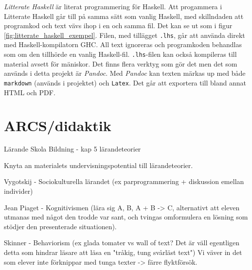 \begin{draft}
\textit{Litterate Haskell} är literat programmering för Haskell.\cite{litterate_haskell}
Att progammera i Litterate Haskell går till på samma sätt som vanlig Haskell,
med skillndaden att programkod och text vävs ihop i en och samma fil. Det kan
se ut som i figur \ref{fig:litterate_haskell_exempel}. Filen, med tillägget
\texttt{.lhs}, går att använda direkt med Haskell-kompilatorn GHC. All text
ignoreras och programkoden behandlas som om den tillhörde en vanlig
Haskell-fil. \texttt{.lhs}-filen kan också kompileras till material avsett för
mäniskor. Det finns flera verktyg som gör det men det som används i detta
projekt är \textit{Pandoc}\cite{pandoc}. Med \textit{Pandoc} kan texten märkas
up med både \texttt{markdown} (används i projektet) och \texttt{Latex}. Det går
att exportera till bland annat HTML och PDF.  \end{draft}
\section{ARCS/didaktik}
\label{sec:arcs}

\begin{binge}

Lärande Skola Bildning - kap 5 lärandeteorier

Knyta an materialets undervisningspotential till lärandeteorier.

Vygotskij - Sociokulturella lärandet (ex parprogrammering + diskussion emellan individer)

Jean Piaget - Kognitivismen (lära sig A, B, A + B -> C, alternativt att eleven utmanas med något den trodde var sant, och tvingas omformulera en lösning som stödjer den presenterade situationen).

Skinner - Behaviorism (ex glada tomater vs wall of text? Det är väll egentligen detta som hindrar läsare att läsa en "tråkig, tung svårläst text")
Vi väver in det som elever inte förknippar med tunga texter -> färre flyktförsök.

\iffalse
Skulle vilja hitta stöd för:
Bara något som olika bakgrunder skulle kunna ge en inbillning av miljöombyte, vilket minskar den monotona dimensionen, och i sig förhindrar hjärnans anti-"get-stuck-on-a-thought-and-die".
\fi

\end{binge}
